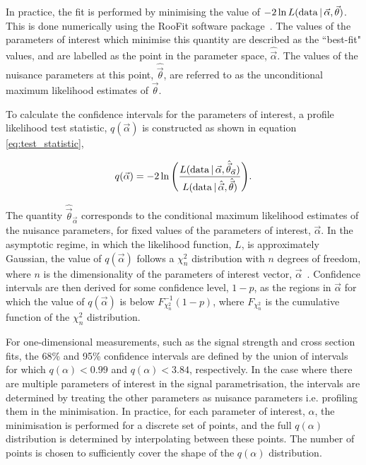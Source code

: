 In practice, the fit is performed by minimising the value of $-2 \ln L({\rm{data}}\,|\,\vec{\alpha},\vec{\theta})$. This is done numerically using the RooFit software package~\cite{Verkerke:2003ir}. The values of the parameters of interest which minimise this quantity are described as the ``best-fit" values, and are labelled as the point in the parameter space, $\hat{\vec{\alpha}}$. The values of the nuisance parameters at this point, $\hat{\vec{\theta}}$, are referred to as the unconditional maximum likelihood estimates of $\vec{\theta}$. 

To calculate the confidence intervals for the parameters of interest, a profile likelihood test statistic, $q(\vec{\alpha})$ is constructed as shown in equation \ref{eq:test_statistic},

\begin{equation}\label{eq:test_statistic}
    q(\vec{\alpha}) = -2 \ln \Bigg( \frac{L({\rm{data}}\,|\,\vec{\alpha},\hat{\vec{\theta}}_{\vec{\alpha}})}{L({\rm{data}}\,|\,\hat{\vec{\alpha}},\hat{\vec{\theta}})} \Bigg).
\end{equation}

\noindent
The quantity $\hat{\vec{\theta}}_{\vec{\alpha}}$ corresponds to the conditional maximum likelihood estimates of the nuisance parameters, for fixed values of the parameters of interest, $\vec{\alpha}$. In the asymptotic regime, in which the likelihood function, $L$, is approximately Gaussian, the value of $q(\vec{\alpha})$ follows a $\chi_n^2$ distribution with $n$ degrees of freedom, where $n$ is the dimensionality of the parameters of interest vector, $\vec{\alpha}$~\cite{Cowan:2010js}. Confidence intervals are then derived for some confidence level, $1-p$, as the regions in $\vec{\alpha}$ for which the value of $q(\vec{\alpha})$ is below $F^{-1}_{\chi^2_n}(1-p)$, where $F_{\chi^2_n}$ is the cumulative function of the $\chi^2_n$ distribution.

For one-dimensional measurements, such as the signal strength and cross section fits, the 68\% and 95\% confidence intervals are defined by the union of intervals for which $q(\alpha)<0.99$ and $q(\alpha)<3.84$, respectively. In the case where there are multiple parameters of interest in the signal parametrisation, the intervals are determined by treating the other parameters as nuisance parameters i.e. profiling them in the minimisation. In practice, for each parameter of interest, $\alpha$, the minimisation is performed for a discrete set of points, and the full $q(\alpha)$ distribution is determined by interpolating between these points. The number of points is chosen to sufficiently cover the shape of the $q(\alpha)$ distribution.

